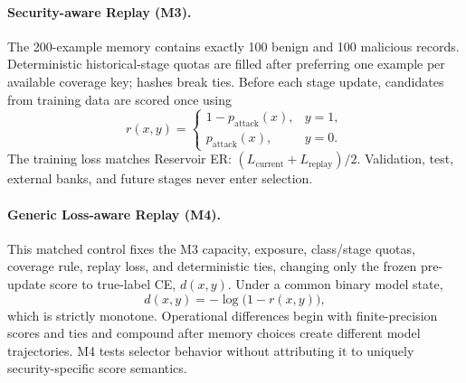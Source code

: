 \documentclass[conference]{IEEEtran}
\begin{document}
\paragraph{Security-aware Replay (M3).}
The 200-example memory contains exactly 100 benign and 100 malicious records. Deterministic historical-stage quotas are filled after preferring one example per available coverage key; hashes break ties. Before each stage update, candidates from training data are scored once using
\begin{equation}
r(x,y)=
\begin{cases}
1-p_{\mathrm{attack}}(x), & y=1,\\
p_{\mathrm{attack}}(x), & y=0.
\end{cases}
\end{equation}
The training loss matches Reservoir ER: $(L_{\mathrm{current}}+L_{\mathrm{replay}})/2$. Validation, test, external banks, and future stages never enter selection.

\paragraph{Generic Loss-aware Replay (M4).}
This matched control fixes the M3 capacity, exposure, class/stage quotas, coverage rule, replay loss, and deterministic ties, changing only the frozen pre-update score to true-label CE, $d(x,y)$. Under a common binary model state,
\begin{equation}
d(x,y)=-\log\bigl(1-r(x,y)\bigr),
\end{equation}
which is strictly monotone. Operational differences begin with finite-precision scores and ties and compound after memory choices create different model trajectories. M4 tests selector behavior without attributing it to uniquely security-specific score semantics.
\end{document}
